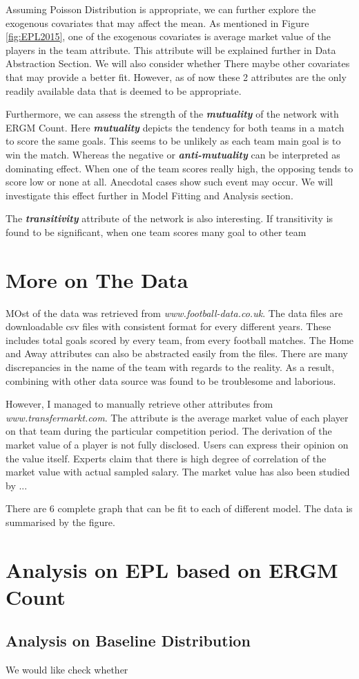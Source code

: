 \documentclass[12pt,a4paper,twoside,openany]{book}\usepackage[]{graphicx}\usepackage[]{color}
\newcommand{\BI}[1]{\textit{\textbf{#1}}}
\begin{document}
Assuming Poisson Distribution is appropriate, we can further explore the exogenous covariates that may affect the mean. 
As mentioned in Figure \ref{fig:EPL2015}, one of the exogenous covariates is average market value of the players in the team attribute. 
This attribute will be explained further in Data Abstraction Section.
We will also consider whether 
There maybe other covariates that may provide a better fit.
However, as of now these 2 attributes are the only readily available data that is deemed to be appropriate.

Furthermore, we can assess the strength of the \BI{mutuality} of the network with ERGM Count.
Here \BI{mutuality} depicts the tendency for both teams in a match to score the same goals.
This seems to be unlikely as each team main goal is to win the match. 
Whereas the negative or \BI{anti-mutuality} can be interpreted as dominating effect.
When one of the team scores really high, the opposing tends to score low or none at all.
Anecdotal cases show such event may occur. 
We will investigate this effect further in Model Fitting and Analysis section.

The \BI{transitivity} attribute of the network is also interesting. 
If transitivity is found to be significant, when one team scores many goal to other team  

\section{More on The Data}
MOst of the data was retrieved from \textit{www.football-data.co.uk}.
The data files are downloadable csv files with consistent format for every different years.
These includes total goals scored by every team, from every football matches. 
The Home and Away attributes can also be abstracted easily from the files. 
There are many discrepancies in the name of the team with regards to the reality.
As a result, combining with other data source was found to be troublesome and laborious.

However, I managed to manually retrieve other attributes from \textit{www.transfermarkt.com}.
The attribute is the average market value of each player on that team during the particular competition period. 
The derivation of the market value of a player is not fully disclosed.
Users can express their opinion on the value itself.
Experts claim that there is high degree of correlation of the market value with actual sampled salary.
The market value has also been studied by ...

There are 6 complete graph that can be fit to each of different model. The data is summarised by the figure.

\section{Analysis on EPL based on ERGM Count}
\subsection{Analysis on Baseline Distribution}
We would like check whether 




{}



\end{document}
